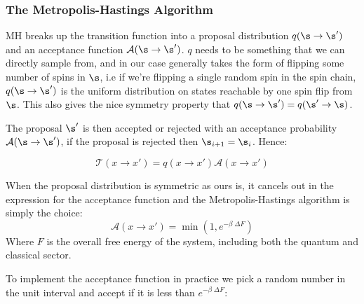 \hypertarget{the-metropolis-hastings-algorithm}{%
\subsubsection{The Metropolis-Hastings Algorithm}\label{the-metropolis-hastings-algorithm}}

MH breaks up the transition function into a proposal distribution \(q(\s \to \s')\) and an acceptance function \(\mathcal{A}(\s \to \s')\). \(q\) needs to be something that we can directly sample from, and in our case generally takes the form of flipping some number of spins in \(\s\), i.e if we're flipping a single random spin in the spin chain, \(q(\s \to \s')\) is the uniform distribution on states reachable by one spin flip from \(\s\). This also gives the nice symmetry property that \(q(\s \to \s') = q(\s' \to \s)\).

The proposal \(\s'\) is then accepted or rejected with an acceptance probability \(\mathcal{A}(\s \to \s')\), if the proposal is rejected then \(\s_{i+1} = \s_{i}\). Hence:

\[\mathcal{T}(x\to x') = q(x\to x')\mathcal{A}(x \to x')\]

When the proposal distribution is symmetric as ours is, it cancels out in the expression for the acceptance function and the Metropolis-Hastings algorithm is simply the choice: \[ \mathcal{A}(x \to x') = \min\left(1, e^{-\beta\;\Delta F}\right)\] Where \(F\) is the overall free energy of the system, including both the quantum and classical sector.

To implement the acceptance function in practice we pick a random number in the unit interval and accept if it is less than \(e^{-\beta\;\Delta F}\):

\begin{Shaded}
\begin{Highlighting}[]
\OperatorTok{=}

 
\OperatorTok{=}
\OperatorTok{=}

    \NormalTok{,}\NormalTok{) }\OperatorTok{\textless{}}\OperatorTok{{-}}\OperatorTok{*}
\OperatorTok{=}
        
\OperatorTok{=}
\end{Highlighting}
\end{Shaded}

